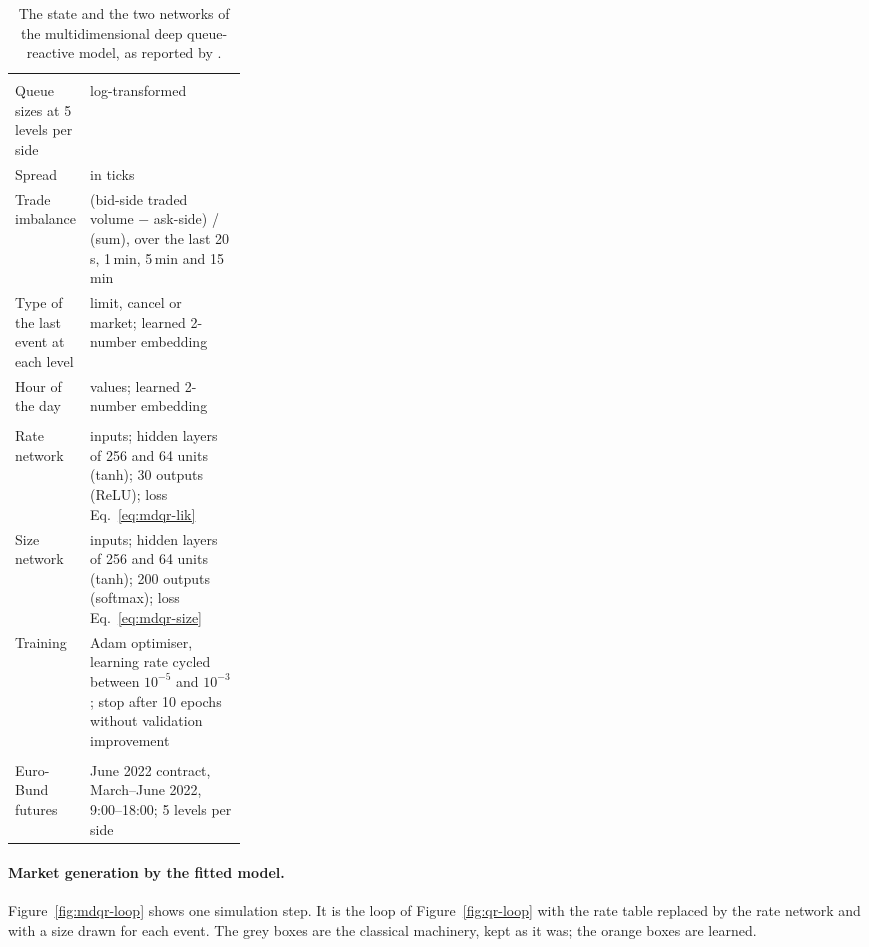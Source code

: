 \begin{table}[!htbp]
\centering\footnotesize
\caption{The state and the two networks of the multidimensional deep queue-reactive model, as reported
by \citet{deepqr}.}
\label{tab:mdqr-spec}
\begin{tabularx}{\linewidth}{>{\raggedright\arraybackslash}p{0.27\linewidth}>{\raggedright\arraybackslash}X}
\toprule
\multicolumn{2}{l}{\textit{State $\mathbf{y}_k$}}\\
Queue sizes at 5 levels per side & log-transformed \\
Spread & in ticks \\
Trade imbalance & (bid-side traded volume $-$ ask-side) / (sum), over the last 20\,s, 1\,min, 5\,min and 15\,min \\
Type of the last event at each level & limit, cancel or market; learned 2-number embedding \\
Hour of the day & 9 values; learned 2-number embedding \\
\midrule
\multicolumn{2}{l}{\textit{Networks}}\\
Rate network & 25 inputs; hidden layers of 256 and 64 units (tanh); 30 outputs (ReLU); loss Eq.~\eqref{eq:mdqr-lik} \\
Size network & 27 inputs; hidden layers of 256 and 64 units (tanh); 200 outputs (softmax); loss Eq.~\eqref{eq:mdqr-size} \\
Training & Adam optimiser, learning rate cycled between $10^{-5}$ and $10^{-3}$; stop after 10 epochs without validation improvement \\
\midrule
\multicolumn{2}{l}{\textit{Data}}\\
Euro-Bund futures & June 2022 contract, March--June 2022, 9:00--18:00; 5 levels per side \\
\bottomrule
\end{tabularx}
\end{table}

\paragraph{Market generation by the fitted model.} Figure~\ref{fig:mdqr-loop} shows one simulation step.
It is the loop of Figure~\ref{fig:qr-loop} with the rate table replaced by the rate network and with a size
drawn for each event. The grey boxes are the classical machinery, kept as it was; the orange boxes are learned.

